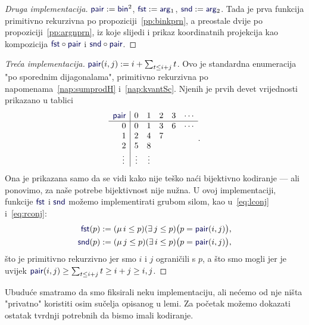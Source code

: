\begin{proof}[Druga implementacija] $\f{pair}:=\f{bin}^2$, $\f{fst}:=\f{arg}_1$, $\f{snd}:=\f{arg}_2$. Tada je prva funkcija primitivno rekurzivna po propoziciji~\ref{pp:binkprn}, a preostale dvije po propoziciji~\ref{pp:argnprn}, iz koje slijedi i prikaz koordinatnih projekcija kao kompozicija $\f{fst}\circ\f{pair}$ i $\f{snd}\circ\f{pair}$.
\end{proof}

\begin{proof}[Treća implementacija] $\f{pair}(i,j):=i+\sum_{t\le i+j}t$. Ovo je standardna enumeracija "po sporednim dijagonalama", primitivno rekurzivna po napomenama~\ref{nap:sumprodH} i~\ref{nap:kvantSc}. Njenih je prvih devet vrijednosti prikazano u tablici \begin{equation}
\begin{array}{r|ccccc}
\f{pair}&0&1&2&3&\cdots\\\hline
0&0&1&3&6&\cdots\\
1&2&4&7\\
2&5&8\\
\vdots\,&\vdots&\vdots\\
\end{array}\text.
\end{equation}
Ona je prikazana samo da se vidi kako nije teško naći bijektivno kodiranje --- ali ponovimo, za naše potrebe bijektivnost nije nužna. U ovoj implementaciji, funkcije $\f{fst}$ i $\f{snd}$ možemo implementirati grubom silom, kao u~\eqref{eq:lconj} i~\eqref{eq:rconj}:
\begin{align}
    \f{fst}(p)&:=(\mu\,i\le p)(\exists\,j\le p)\bigl(p=\f{pair}(i,j)\bigr)\text,\\
    \f{snd}(p)&:=(\mu\,j\le p)(\exists\,i\le p)\bigl(p=\f{pair}(i,j)\bigr)\text,
\end{align}
što je primitivno rekurzivno jer smo $i$ i $j$ ograničili s $p$, a što smo mogli jer je uvijek $\f{pair}(i,j)\ge\sum_{t\le i+j}t\ge i+j\ge i,j$.
\end{proof}

Ubuduće smatramo da smo fiksirali neku implementaciju, ali nećemo od nje ništa "privatno" koristiti osim sučelja opisanog u lemi. Za početak možemo dokazati ostatak tvrdnji potrebnih da bismo imali kodiranje.

